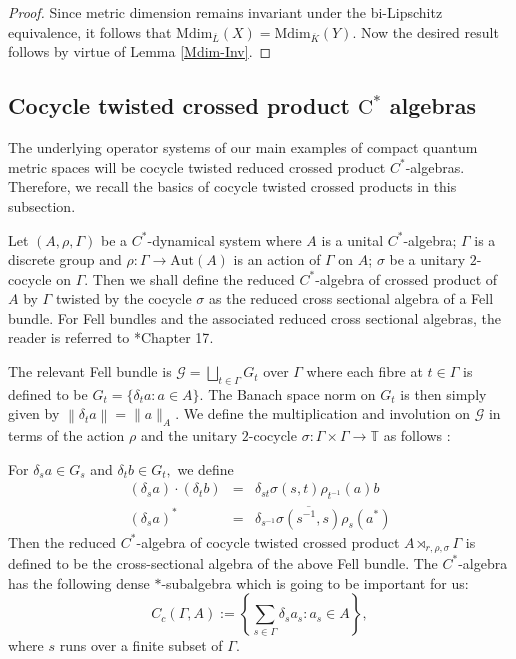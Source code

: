 \documentclass[a4paper,11pt,reqno]{amsart}
\theoremstyle{plain}
\theoremstyle{mainthmstyle}
\theoremstyle{named}
\numberwithin{equation}{section}
\newcommand{\Bea}{\begin{eqnarray*}}
\newcommand{\Eea}{\end{eqnarray*}}
\begin{document}
\begin{proof}
Since metric dimension remains invariant under the bi-Lipschitz equivalence, it follows that $\mathrm {Mdim}_{\overline {L}} (X) = \mathrm {Mdim}_{\overline {K}} (Y).$ Now the desired result follows by virtue of Lemma \ref{Mdim-Inv}.
\end{proof}
\subsection{Cocycle twisted crossed product \texorpdfstring{$\mathrm{C}^{\ast}$}{C*-} algebras} The underlying operator systems of our main examples of compact quantum metric spaces will be cocycle twisted reduced crossed product $C^{\ast}$-algebras. Therefore, we recall the basics of cocycle twisted crossed products in this subsection.

Let $(A,\rho,\Gamma)$ be a $C^{\ast}$-dynamical system where $A$ is a unital $C^{\ast}$-algebra; $\Gamma$ is a discrete group and $\rho:\Gamma\rightarrow\mathrm{Aut}(A)$ is an action of $\Gamma$ on $A$; $\sigma$ be a unitary $2$-cocycle on $\Gamma$. Then we shall define the reduced $C^{\ast}$-algebra of crossed product of $A$ by $\Gamma$ twisted by the cocycle $\sigma$ as the reduced cross sectional algebra of a Fell bundle. For Fell bundles and the associated reduced cross sectional algebras, the reader is referred to \cite{Exel-Fell}*{Chapter 17}.

The relevant Fell bundle is $\mathcal{G}=\bigsqcup\limits_{t \in \Gamma} G_t$ over $\Gamma$ where each fibre at $t\in\Gamma$ is defined to be $G_{t}=\{\delta_t a:a\in A\}$. The Banach space norm on $G_t$ is then simply given by $\left \|\delta_t a \right \| = \|a\|_A.$
We define the multiplication and involution on $\mathcal{G}$ in terms of the action $\rho$ and the unitary $2$-cocycle $\sigma : \Gamma \times\Gamma\rightarrow \mathbb{T}$ as follows $:$

For $\delta_s a \in G_s$ and $\delta_t b \in G_t,$ we define
\Bea
    (\delta_s a) \cdot (\delta_t b) & = & \delta_{st} \sigma(s, t) \rho_{t^{-1}}(a) b \\
    (\delta_s a)^* & = & \delta_{s^{-1}} \overline{\sigma(s^{-1}, s)}\rho_s(a^*)
\Eea
Then the reduced $C^{\ast}$-algebra of cocycle twisted crossed product $A\rtimes_{r,\rho,\sigma}\Gamma$ is defined to be the cross-sectional algebra of the above Fell bundle. The $C^{\ast}$-algebra has the following dense $\ast$-subalgebra which is going to be important for us:
\begin{displaymath}
    C_{c}(\Gamma,A):=\left \{\sum_{s\in\Gamma}\delta_{s} a_{s}:a_s\in A \right \},
\end{displaymath}
where $s$ runs over a finite subset of $\Gamma$.\\
\end{document}
